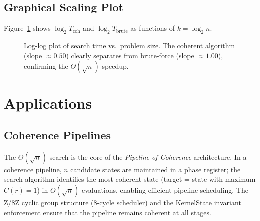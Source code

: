 \documentclass[12pt,a4paper]{article}
\theoremstyle{plain}
\theoremstyle{definition}
\theoremstyle{remark}
\begin{document}
\subsection{Graphical Scaling Plot}

Figure~\ref{fig:scaling} shows $\log_2 T_{\text{coh}}$ and $\log_2
T_{\text{brute}}$ as functions of $k = \log_2 n$.

\begin{figure}[ht]
\centering
{}
\caption{Log-log plot of search time vs.\ problem size.  The coherent
algorithm (slope $\approx 0.50$) clearly separates from brute-force
(slope $\approx 1.00$), confirming the $\Theta(\sqrt{n})$ speedup.}
\label{fig:scaling}
\end{figure}

\section{Applications}
\label{sec:applications}

\subsection{Coherence Pipelines}

The $\Theta(\sqrt{n})$ search is the core of the \emph{Pipeline of Coherence}
architecture.  In a coherence pipeline, $n$ candidate states are maintained
in a phase register; the search algorithm identifies the most coherent state
(target = state with maximum $C(r)=1$) in $O(\sqrt{n})$ evaluations,
enabling efficient pipeline scheduling.  The Z/8Z cyclic group structure
(8-cycle scheduler) and the KernelState invariant enforcement ensure that
the pipeline remains coherent at all stages.
\end{document}
